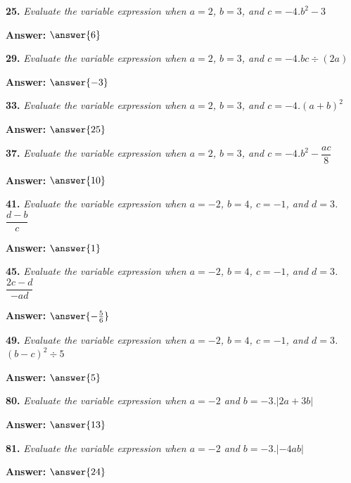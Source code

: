 \documentclass{ximera}
\begin{document}
\begin{problem}
\textbf{25.} \emph{Evaluate the variable expression when $a = 2$, $b = 3$, and $c = -4$.}\quad $b^2 - 3$

\textbf{Answer:} $\answer{6}$
\end{problem}

\begin{problem}
\textbf{29.} \emph{Evaluate the variable expression when $a = 2$, $b = 3$, and $c = -4$.}\quad $bc \div (2a)$

\textbf{Answer:} $\answer{-3}$
\end{problem}

\begin{problem}
\textbf{33.} \emph{Evaluate the variable expression when $a = 2$, $b = 3$, and $c = -4$.}\quad $(a + b)^2$

\textbf{Answer:} $\answer{25}$
\end{problem}

\begin{problem}
\textbf{37.} \emph{Evaluate the variable expression when $a = 2$, $b = 3$, and $c = -4$.}\quad $b^2 - \dfrac{ac}{8}$

\textbf{Answer:} $\answer{10}$
\end{problem}

\begin{problem}
\textbf{41.} \emph{Evaluate the variable expression when $a = -2$, $b = 4$, $c = -1$, and $d = 3$.}\quad $\dfrac{d - b}{c}$

\textbf{Answer:} $\answer{1}$
\end{problem}

\begin{problem}
\textbf{45.} \emph{Evaluate the variable expression when $a = -2$, $b = 4$, $c = -1$, and $d = 3$.}\quad $\dfrac{2c - d}{-ad}$

\textbf{Answer:} $\answer{-\frac{5}{6}}$
\end{problem}

\begin{problem}
\textbf{49.} \emph{Evaluate the variable expression when $a = -2$, $b = 4$, $c = -1$, and $d = 3$.}\quad $(b - c)^2 \div 5$

\textbf{Answer:} $\answer{5}$
\end{problem}

\begin{problem}
\textbf{80.} \emph{Evaluate the variable expression when $a = -2$ and $b = -3$.}\quad $|2a + 3b|$

\textbf{Answer:} $\answer{13}$
\end{problem}

\begin{problem}
\textbf{81.} \emph{Evaluate the variable expression when $a = -2$ and $b = -3$.}\quad $\lvert -4ab \rvert$

\textbf{Answer:} $\answer{24}$
\end{problem}
\end{document}
